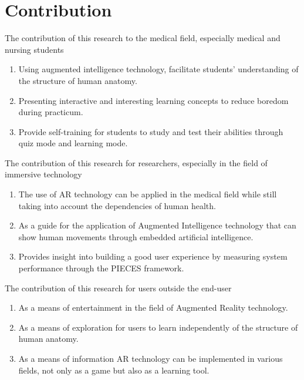 \section{Contribution}
The contribution of this research to the medical field, especially medical and nursing students
\begin{enumerate}
    \item Using augmented intelligence technology, facilitate students' understanding of the structure of human anatomy.
    \item Presenting interactive and interesting learning concepts to reduce boredom during practicum.
    \item Provide self-training for students to study and test their abilities through quiz mode and learning mode.
\end{enumerate}
The contribution of this research for researchers, especially in the field of immersive technology
\begin{enumerate}
    \item The use of AR technology can be applied in the medical field while still taking into account the dependencies of human health.
    \item As a guide for the application of Augmented Intelligence technology that can show human movements through embedded artificial intelligence.
    \item Provides insight into building a good user experience by measuring system performance through the PIECES framework.
\end{enumerate}
The contribution of this research for users outside the end-user
\begin{enumerate}
    \item As a means of entertainment in the field of Augmented Reality technology.
    \item As a means of exploration for users to learn independently of the structure of human anatomy.
     \item As a means of information AR technology can be implemented in various fields, not only as a game but also as a learning tool.
\end{enumerate}

